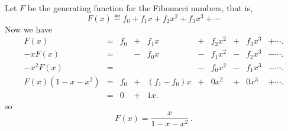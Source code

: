 \documentclass[handout]{mcs}
\begin{document}
Let $F$ be the generating function for the Fibonacci numbers, that is,
\[
F(x) \eqdef f_0 + f_1 x + f_2 x^2 + f_3 x^3 + \cdots
\]
Now we have
\[
\begin{array}{rcrcrcrcrcr}
F(x)     & = & f_0 & + & f_1  x & + & f_2 x^2 & + & f_3 x^3 &  + \cdots.\\
-xF(x)   & = &     & - & f_0  x & - & f_1 x^2 & - & f_2 x^3 &  - \cdots.\\
-x^2F(x) & = &     &   &        & - & f_0 x^2 & - & f_1 x^3 &  - \cdots.\\
\hline
F(x)(1-x-x^2) 
         & = & f_0 & + & (f_1-f_0) 
                              x & + &   0 x^2 & + &   0 x^3 &  + \cdots.\\
         & = &  0  & + &   1  x.
\end{array}
\]
so
\[
F(x) = \frac{x}{1 - x - x^2}\, .
\]
\fi
\end{document}
